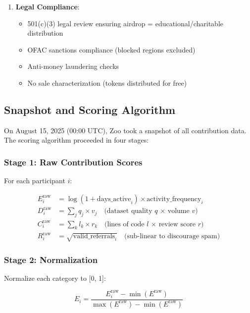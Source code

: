\begin{enumerate}
\item \textbf{Legal Compliance}:
    \begin{itemize}
    \item 501(c)(3) legal review ensuring airdrop = educational/charitable distribution
    \item OFAC sanctions compliance (blocked regions excluded)
    \item Anti-money laundering checks
    \item No sale characterization (tokens distributed for free)
    \end{itemize}
\end{enumerate}

\subsection{Snapshot and Scoring Algorithm}

On August 15, 2025 (00:00 UTC), Zoo took a snapshot of all contribution data. The scoring algorithm proceeded in four stages:

\subsubsection{Stage 1: Raw Contribution Scores}

For each participant $i$:

\begin{align}
E_i^{\text{raw}} &= \log(1 + \text{days\_active}_i) \times \text{activity\_frequency}_i \\
D_i^{\text{raw}} &= \sum_{j} q_j \times v_j \quad \text{(dataset quality $q$ × volume $v$)} \\
C_i^{\text{raw}} &= \sum_{k} l_k \times r_k \quad \text{(lines of code $l$ × review score $r$)} \\
R_i^{\text{raw}} &= \sqrt{\text{valid\_referrals}_i} \quad \text{(sub-linear to discourage spam)}
\end{align}

\subsubsection{Stage 2: Normalization}

Normalize each category to [0, 1]:

\begin{equation}
E_i = \frac{E_i^{\text{raw}} - \min(E^{\text{raw}})}{\max(E^{\text{raw}}) - \min(E^{\text{raw}})}
\end{equation}

